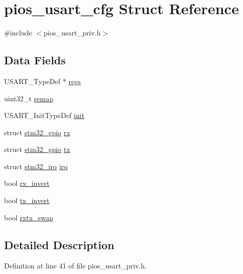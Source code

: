 \hypertarget{structpios__usart__cfg}{\section{pios\-\_\-usart\-\_\-cfg \-Struct \-Reference}
\label{structpios__usart__cfg}
}


{\ttfamily \#include $<$pios\-\_\-usart\-\_\-priv.\-h$>$}

\subsection*{\-Data \-Fields}
\begin{DoxyCompactItemize}
\item 
\-U\-S\-A\-R\-T\-\_\-\-Type\-Def $\ast$ \hyperlink{structpios__usart__cfg_a28b475a517c9d2fee0ab1a87d3c6ca67}{regs}
\item 
uint32\-\_\-t \hyperlink{structpios__usart__cfg_a811f7d8ba9be86fdade5aedee961ebb2}{remap}
\item 
\-U\-S\-A\-R\-T\-\_\-\-Init\-Type\-Def \hyperlink{structpios__usart__cfg_a20bd842c61ef010b8bfcf2cc42c19d1a}{init}
\item 
struct \hyperlink{structstm32__gpio}{stm32\-\_\-gpio} \hyperlink{structpios__usart__cfg_a8d393f43a5f748de6580907c5f7d0a48}{rx}
\item 
struct \hyperlink{structstm32__gpio}{stm32\-\_\-gpio} \hyperlink{structpios__usart__cfg_adc652d014f5c2fd4c1cc152df614ba64}{tx}
\item 
struct \hyperlink{structstm32__irq}{stm32\-\_\-irq} \hyperlink{structpios__usart__cfg_aa2e41bd55618914f579729a722e2133e}{irq}
\item 
bool \hyperlink{structpios__usart__cfg_a89504d674cb5ee30a137ad3d0405c8dd}{rx\-\_\-invert}
\item 
bool \hyperlink{structpios__usart__cfg_afc7c29e0ea546f0e5ed89b0063a51198}{tx\-\_\-invert}
\item 
bool \hyperlink{structpios__usart__cfg_a19b707efa22b300cd9af50ded5e95b6d}{rxtx\-\_\-swap}
\end{DoxyCompactItemize}


\subsection{\-Detailed \-Description}


\-Definition at line 41 of file pios\-\_\-usart\-\_\-priv.\-h.



